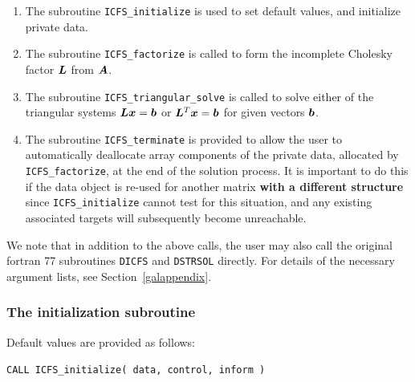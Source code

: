 \documentclass{galahad}
\newcommand{\packagename}{ICFS}
\begin{document}
\begin{enumerate}
\item The subroutine
      {\tt \packagename\_initialize}
      is used to set default values, and initialize private data.
\item The subroutine
      {\tt \packagename\_factorize}
      is called to form the incomplete Cholesky factor ${\bm{L}}$ from ${\bm{A}}$.
\item The subroutine
      {\tt \packagename\_triangular\_solve}
      is called to solve either of the triangular systems
      ${\bm{L}} {\bm{x}} = {\bm{b}}$ or ${\bm{L}}^T {\bm{x}} = {\bm{b}}$
      for given vectors ${\bm{b}}$.
\item The subroutine
      {\tt \packagename\_terminate}
      is provided to allow the user to automatically deallocate array
       components of the private data, allocated by
       {\tt \packagename\_factorize},
       at the end of the solution process.
       It is important to do this if the data object is re-used for another
       matrix {\bf with a different structure}
       since {\tt \packagename\_initialize} cannot test for this situation,
       and any existing associated targets will subsequently become unreachable.
\end{enumerate}

\noindent
We note that in addition to the above calls, the user may also call the
original fortran 77 subroutines {\tt DICFS} and {\tt DSTRSOL} directly.
For details of the necessary argument lists, see Section~\ref{galappendix}.



\subsubsection{The initialization subroutine}\label{subinit}
 Default values are provided as follows:
\vspace*{1mm}

\hspace{8mm}
{\tt CALL \packagename\_initialize( data, control, inform )}
\end{document}
